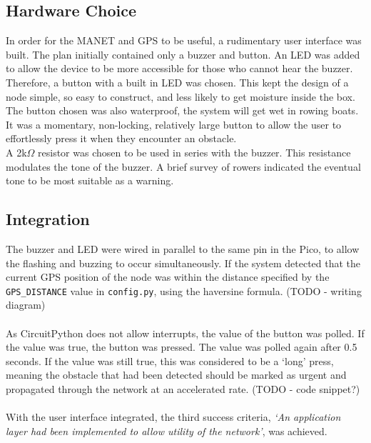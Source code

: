 \documentclass[12pt,a4paper]{report}
\begin{document}
\subsection{Hardware Choice}
In order for the MANET and GPS to be useful, a rudimentary user interface was built. The plan initially contained only a buzzer and button. An LED was added to allow the device to be more accessible for those who cannot hear the buzzer. 
Therefore, a button with a built in LED was chosen. This kept the design of a node simple, so easy to construct, and less likely to get moisture inside the box. The button chosen was also waterproof, the system will get wet in rowing boats. It was a momentary, non-locking, relatively large button to allow the user to effortlessly press it when they encounter an obstacle. \\
A 2k$\Omega$ resistor was chosen to be used in series with the buzzer. This resistance modulates the tone of the buzzer. A brief survey of rowers indicated the eventual tone to be most suitable as a warning. 

\subsection{Integration}
The buzzer and LED were wired in parallel to the same pin in the Pico, to allow the flashing and buzzing to occur simultaneously. If the system detected that the current GPS position of the node was within the distance specified by the \verb'GPS_DISTANCE' value in \verb'config.py', using the haversine formula. (TODO - writing diagram) \\ \\ 
As CircuitPython does not allow interrupts, the value of the button was polled. If the value was true, the button was pressed. The value was polled again after 0.5 seconds. If the value was still true, this was considered to be a `long' press, meaning the obstacle that had been detected should be marked as urgent and propagated through the network at an accelerated rate. (TODO - code snippet?) \\ \\
With the user interface integrated, the third success criteria, \emph{`An application layer had been implemented to allow utility of the network'}, was achieved. 
\end{document}
